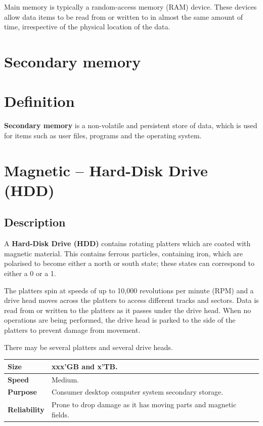 \documentclass[a4paper]{systems-software}
\begin{document}
Main memory is typically a random-access memory (RAM) device. These devices allow data items to be read from or written to in almost the same amount of time, irrespective of the physical location of the data.


\section{Secondary memory}

\section*{Definition}

\textbf{Secondary memory} is a non-volatile and persistent store of data, which is used for items such as user files, programs and the operating system.


\section*{Magnetic -- Hard-Disk Drive (HDD)}

\subsection*{Description}

A \textbf{Hard-Disk Drive (HDD)} contains rotating platters which are coated with magnetic material. This contains ferrous particles, containing iron, which are polarised to become either a north or south state; these states can correspond to either a 0 or a 1.

The platters spin at speeds of up to 10,000 revolutions per minute (RPM) and a drive head moves across the platters to access different tracks and sectors. Data is read from or written to the platters as it passes under the drive head. When no operations are being performed, the drive head is parked to the side of the platters to prevent damage from movement.

There may be several platters and several drive heads.

\begin{longtabu} to \textwidth {| X[1,l] | X[6,l] |}
    \hline
    \textbf{Size} & xxx’GB and x’TB.
	\\ \hline
	\textbf{Speed} & Medium.
	\\ \hline
	\textbf{Purpose} & Consumer desktop computer system secondary storage.
	\\ \hline
	\textbf{Reliability} & Prone to drop damage as it has moving parts and magnetic fields.
	\\ \hline
\end{longtabu}
\end{document}
